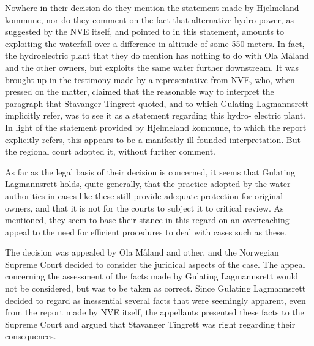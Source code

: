 Nowhere in their decision do they mention the statement made by Hjelmeland kommune, nor do they comment on the fact that alternative hydro-power, as suggested by the NVE itself, and pointed to in this statement, amounts to exploiting the waterfall over a difference in altitude of some 550 meters. In fact, the hydroelectric plant that they do mention has nothing to do with Ola Måland and the other owners, but exploits the same water further downstream. It was brought up in the testimony made by a representative from NVE, who, when pressed on the matter, claimed that the reasonable way to interpret the paragraph that Stavanger Tingrett quoted, and to which Gulating Lagmannsrett implicitly refer, was to see it as a statement regarding this hydro- electric plant. In light of the statement provided by Hjelmeland kommune, to which the report explicitly refers, this appears to be a manifestly ill-founded interpretation. But the regional court adopted it, without further comment.

As far as the legal basis of their decision is concerned, it seems that Gulating Lagmannsrett holds, quite generally, that the practice adopted by the water authorities in cases like these still provide adequate protection for original owners, and that it is not for the courts to subject it to critical review. As mentioned, they seem to base their stance in this regard on an overreaching appeal to the need for efficient procedures to deal with cases such as these.

The decision was appealed by Ola Måland and other, and the Norwegian Supreme Court decided to consider the juridical aspects of the case. The appeal concerning the assessment of the facts made by Gulating Lagmannsrett would not be considered, but was to be taken as correct. Since Gulating Lagmannsrett decided to regard as inessential several facts that were seemingly apparent, even from the report made by NVE itself, the appellants presented these facts to the Supreme Court and argued that Stavanger Tingrett was right regarding their consequences. 

